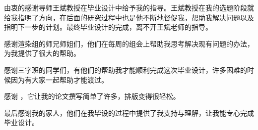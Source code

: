 \begin{acknowledgement}
  由衷的感谢导师王斌教授在毕业设计中给予我的指导。王斌教授在我的选题阶段就给我指明了方向，在后面的研究过程中也是他不断地督促我，帮助我解决问题以及指明下一步的计划。最终毕业设计的完成，离不开王斌老师的指导。

  感谢渲染组的师兄师姐们，他们在每周的组会上帮助我思考解决现有问题的办法，为我提供了很大的帮助。

  感谢三字班的同学们，有他们的帮助我才能顺利完成这次毕业设计，许多困难的时候因为有大家一起帮助才能渡过。

  感谢 \thuthesis，它让我的论文撰写简单了许多，排版变得很轻松。

  最后感谢我的家人，他们在我毕设的过程中提供了我支持与理解，让我能专心完成毕业设计。
\end{acknowledgement}
